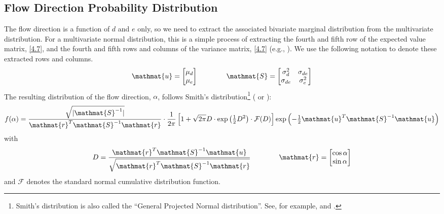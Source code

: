 \documentclass[12pt]{report}
\newcommand{\onehalf}{\textstyle \frac{1}{2} \displaystyle}
\newcommand{\mat}[1]{\mathmat{#1}}
\begin{document}
\subsection{Flow Direction Probability Distribution}
The flow direction is a function of $d$ and $e$ only, so we need to extract the associated bivariate marginal distribution from the multivariate distribution. For a multivariate normal distribution, this is a simple process of extracting the fourth and fifth row of the expected value matrix, \eqref{4.7}, and the fourth and fifth rows and columns of the variance matrix, \eqref{4.7} (e.g., \citet[Section 18.2, Theorem 3]{Roussas1973}). We use the following notation to denote these extracted rows and columns.
%
\begin{equation}\label{6.0.2}
    \mat{u} = \begin{bmatrix} \mu_{d} \\ \mu_{e} \end{bmatrix}
    \qquad \qquad
    \mat{S} = \begin{bmatrix} \sigma_{d}^2 & \sigma_{de} \\ \sigma_{de} & \sigma_{e}^2 \end{bmatrix}
\end{equation}
%
The resulting distribution of the flow direction, $\alpha$, follows Smith's distribution\footnote{Smith's distribution is also called the ``General Projected Normal distribution''. See, for example, \citet{Lark2014} and \citet{Hernandez2017}.} (\citet[Equation (4-11)]{Justus1978} or \citet[Equation (6)]{Carta2008}):
%
\begin{equation}\label{6.0.3}
	f(\alpha) =
    	\dfrac{\sqrt{|\mat{S}^{-1}|}}{\mat{r}^T \mat{S}^{-1} \mat{r}}
	\cdot \frac{1}{2\pi} \left[ 1 + \sqrt{2\pi} D \cdot \exp{\left(\onehalf D^2\right)} \cdot \mathcal{F}(D) \right]
	\exp{\left(-\onehalf \mat{u}^T \mat{S}^{-1} \mat{u} \right)}
\end{equation}
%
with
%
\begin{equation}\label{6.0.4}
	D = \frac{\mat{r}^T \mat{S}^{-1} \mat{u}}{\sqrt{\mat{r}^T \mat{S}^{-1} \mat{r} }}
    \qquad \qquad
    \mat{r} = \begin{bmatrix}\cos{\alpha} \\ \sin{\alpha}\end{bmatrix}
\end{equation}
%
and $\mathcal{F}$ denotes the standard normal cumulative distribution function.
\end{document}

